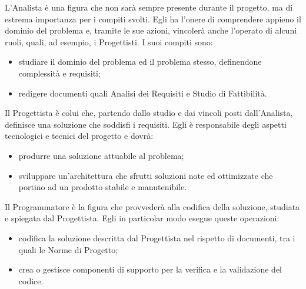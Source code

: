                 L'Analista è una figura che non sarà sempre presente durante il progetto, ma di estrema importanza per i compiti svolti.
                Egli ha l'onere di comprendere appieno il dominio del problema e, tramite le sue azioni, vincolerà anche
                l'operato di alcuni ruoli, quali, ad esempio, i Progettisti.
                I suoi compiti sono:

                    \begin{itemize}
                        \item studiare il dominio del problema ed il problema stesso, definendone complessità e requisiti;
                        \item redigere documenti quali Analisi dei Requisiti e Studio di Fattibilità.
                    \end{itemize}


                Il Progettista è colui che, partendo dallo studio e dai vincoli posti dall'Analista, definisce una
                soluzione che soddisfi i requisiti.
                Egli è responsabile degli aspetti tecnologici e tecnici del progetto e dovrà:

                    \begin{itemize}
                        \item produrre una soluzione attuabile al problema;
                        \item sviluppare un'architettura che sfrutti soluzioni note ed ottimizzate che portino ad un prodotto
                        stabile e manutenibile.
                    \end{itemize}


                Il Programmatore è la figura che provvederà alla codifica della soluzione, studiata e spiegata dal Progettista.
                Egli in particolar modo esegue queste operazioni:

                    \begin{itemize}
                        \item codifica la soluzione descritta dal Progettista nel rispetto di documenti, tra i quali le Norme di Progetto;
                        \item crea o gestisce componenti di supporto per la verifica e la validazione del codice.
                    \end{itemize}

